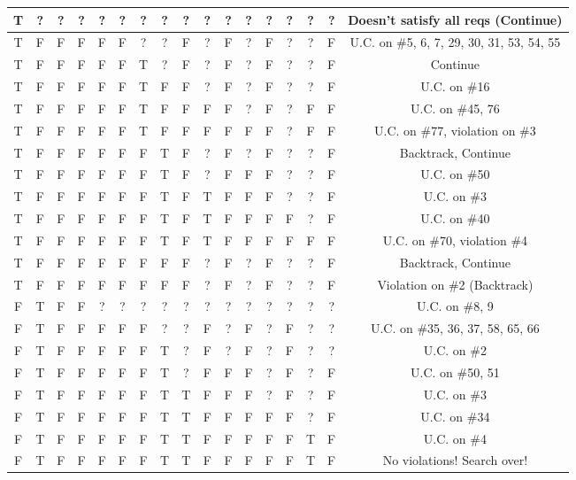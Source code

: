\documentclass[22pt]{article}
\begin{document}
\begin{table}[htbp]
\begin{tabular}{ |c|c|c|c|c|c|c|c|c|c|c|c|c|c|c|c|c| }
 T & ? & ? & ? & ? & ? & ? & ? & ? & ? & ? & ? & ? & ? & ? & ? & Doesn't satisfy all reqs (Continue) \\ \hline
 T & F & F & F & F & F & ? & ? & F & ? & F & ? & F & ? & ? & F & U.C. on \#5, 6, 7, 29, 30, 31, 53, 54, 55 \\ \hline
 T & F & F & F & F & F & T & ? & F & ? & F & ? & F & ? & ? & F & Continue \\ \hline
 T & F & F & F & F & F & T & F & F & ? & F & ? & F & ? & ? & F & U.C. on \#16 \\ \hline
 T & F & F & F & F & F & T & F & F & F & F & ? & F & ? & F & F & U.C. on \#45, 76 \\ \hline
 T & F & F & F & F & F & T & F & F & F & F & F & F & ? & F & F & U.C. on \#77, violation on \#3 \\ \hline
 T & F & F & F & F & F & F & T & F & ? & F & ? & F & ? & ? & F & Backtrack, Continue \\ \hline
 T & F & F & F & F & F & F & T & F & ? & F & F & F & ? & ? & F & U.C. on \#50 \\ \hline
 T & F & F & F & F & F & F & T & F & T & F & F & F & ? & ? & F & U.C. on \#3 \\ \hline
 T & F & F & F & F & F & F & T & F & T & F & F & F & F & ? & F & U.C. on \#40 \\ \hline
 T & F & F & F & F & F & F & T & F & T & F & F & F & F & F & F & U.C. on \#70, violation \#4 \\ \hline
 T & F & F & F & F & F & F & F & F & ? & F & ? & F & ? & ? & F & Backtrack, Continue \\ \hline
 T & F & F & F & F & F & F & F & F & ? & F & ? & F & ? & ? & F & Violation on \#2 (Backtrack) \\ \hline
 F & T & F & F & ? & ? & ? & ? & ? & ? & ? & ? & ? & ? & ? & ? & U.C. on \#8, 9 \\ \hline
 F & T & F & F & F & F & F & ? & ? & F & ? & F & ? & F & ? & ? & U.C. on \#35, 36, 37, 58, 65, 66 \\ \hline
 F & T & F & F & F & F & F & T & ? & F & ? & F & ? & F & ? & ? & U.C. on \#2 \\ \hline
 F & T & F & F & F & F & F & T & ? & F & F & F & ? & F & ? & F & U.C. on \#50, 51 \\ \hline
 F & T & F & F & F & F & F & T & T & F & F & F & ? & F & ? & F & U.C. on \#3 \\ \hline
 F & T & F & F & F & F & F & T & T & F & F & F & F & F & ? & F & U.C. on \#34 \\ \hline
 F & T & F & F & F & F & F & T & T & F & F & F & F & F & T & F & U.C. on \#4 \\ \hline
 F & T & F & F & F & F & F & T & T & F & F & F & F & F & T & F & No violations! Search over! \\ \hline
 \end{tabular}
 \end{table}
\end{document}

